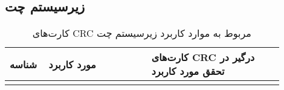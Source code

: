 \subsection{زیرسیستم چت}


\begin{table}[ht!]
	\centering
	\begin{tabular}{|p{0.1\linewidth}|p{0.35\linewidth}|p{0.45\linewidth}|} 
		\hline
		\textbf{شناسه}  & \textbf{ مورد کاربرد}  & \textbf{کارت‌های CRC درگیر در تحقق مورد کاربرد}\\ 
		\hline

		\usecasecrcitem{امکان مشاهده‌ی لیست پیام‌ها}{کاتالوگ پیام، کاربر عادی، پیام}
		\usecasecrcitem{امکان ارسال پیام}{کاتالوگ پیام، کاربر عادی، پیام}
		\usecasecrcitem{امکان دریافت پیام}{کاتالوگ پیام، کاربر عادی، پیام}
	\end{tabular}
	\caption{کارت‌های CRC مربوط به موارد کاربرد زیرسیستم چت}
\end{table}


